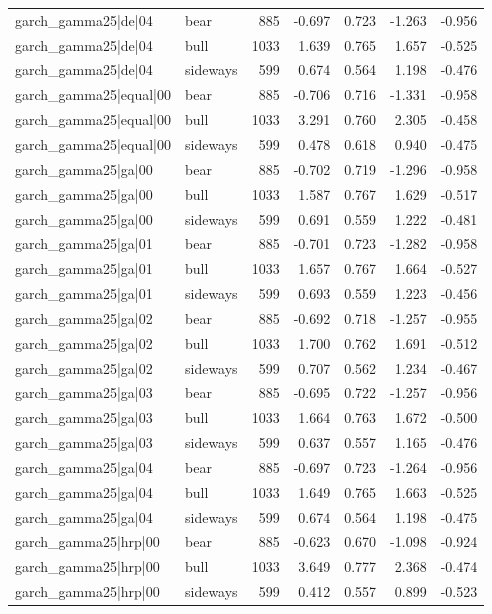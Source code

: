 \begin{table}
\begin{tabular}{llrrrrr}
garch\_gamma25|de|04 & bear & 885 & -0.697 & 0.723 & -1.263 & -0.956 \\
garch\_gamma25|de|04 & bull & 1033 & 1.639 & 0.765 & 1.657 & -0.525 \\
garch\_gamma25|de|04 & sideways & 599 & 0.674 & 0.564 & 1.198 & -0.476 \\
garch\_gamma25|equal|00 & bear & 885 & -0.706 & 0.716 & -1.331 & -0.958 \\
garch\_gamma25|equal|00 & bull & 1033 & 3.291 & 0.760 & 2.305 & -0.458 \\
garch\_gamma25|equal|00 & sideways & 599 & 0.478 & 0.618 & 0.940 & -0.475 \\
garch\_gamma25|ga|00 & bear & 885 & -0.702 & 0.719 & -1.296 & -0.958 \\
garch\_gamma25|ga|00 & bull & 1033 & 1.587 & 0.767 & 1.629 & -0.517 \\
garch\_gamma25|ga|00 & sideways & 599 & 0.691 & 0.559 & 1.222 & -0.481 \\
garch\_gamma25|ga|01 & bear & 885 & -0.701 & 0.723 & -1.282 & -0.958 \\
garch\_gamma25|ga|01 & bull & 1033 & 1.657 & 0.767 & 1.664 & -0.527 \\
garch\_gamma25|ga|01 & sideways & 599 & 0.693 & 0.559 & 1.223 & -0.456 \\
garch\_gamma25|ga|02 & bear & 885 & -0.692 & 0.718 & -1.257 & -0.955 \\
garch\_gamma25|ga|02 & bull & 1033 & 1.700 & 0.762 & 1.691 & -0.512 \\
garch\_gamma25|ga|02 & sideways & 599 & 0.707 & 0.562 & 1.234 & -0.467 \\
garch\_gamma25|ga|03 & bear & 885 & -0.695 & 0.722 & -1.257 & -0.956 \\
garch\_gamma25|ga|03 & bull & 1033 & 1.664 & 0.763 & 1.672 & -0.500 \\
garch\_gamma25|ga|03 & sideways & 599 & 0.637 & 0.557 & 1.165 & -0.476 \\
garch\_gamma25|ga|04 & bear & 885 & -0.697 & 0.723 & -1.264 & -0.956 \\
garch\_gamma25|ga|04 & bull & 1033 & 1.649 & 0.765 & 1.663 & -0.525 \\
garch\_gamma25|ga|04 & sideways & 599 & 0.674 & 0.564 & 1.198 & -0.475 \\
garch\_gamma25|hrp|00 & bear & 885 & -0.623 & 0.670 & -1.098 & -0.924 \\
garch\_gamma25|hrp|00 & bull & 1033 & 3.649 & 0.777 & 2.368 & -0.474 \\
garch\_gamma25|hrp|00 & sideways & 599 & 0.412 & 0.557 & 0.899 & -0.523 \\

\end{tabular}
\end{table}
